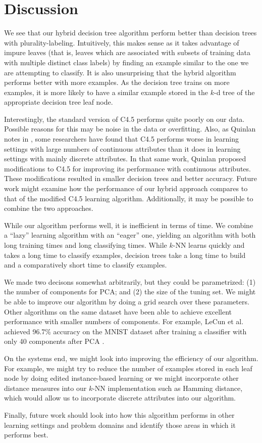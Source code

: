 \section{Discussion}

We see that our hybrid decision tree algorithm perform better than decision trees with plurality-labeling. Intuitively, this makes sense as it takes advantage of impure leaves (that is, leaves which are associated with subsets of training data with multiple distinct class labels) by finding an example similar to the one we are attempting to classify. It is also unsurprising that the hybrid algorithm performs better with more examples. As the decision tree trains on more examples, it is more likely to have a similar example stored in the $k$-d tree of the appropriate decision tree leaf node.

Interestingly, the standard version of C4.5 performs quite poorly on our data. Possible reasons for this may be noise in the data or overfitting. Also, as Quinlan notes in \cite{quinlan1996improved}, some researchers have found that C4.5 performs worse in learning settings with large numbers of continuous attributes than it does in learning settings with mainly discrete attributes. In that same work, Quinlan proposed modifications to C4.5 for improving its performance with continuous attributes. These modifications resulted in smaller decision trees and better accuracy. Future work might examine how the performance of our hybrid approach compares to that of the modified C4.5 learning algorithm.  Additionally, it may be possible to combine the two approaches.

While our algorithm performs well, it is inefficient in terms of time. We combine a ``lazy'' learning algorithm with an ``eager'' one, yielding an algorithm with both long training times and long classifying times. While $k$-NN learns quickly and takes a long time to classify examples, decision trees take a long time to build and a comparatively short time to classify examples.

We made two decisons somewhat arbitrarily, but they could be parametrized: (1) the number of components for PCA; and (2) the size of the tuning set. We might be able to improve our algorithm by doing a grid search over these parameters. Other algorithms on the same dataset have been able to achieve excellent performance with smaller numbers of components.  For example, LeCun et al. achieved 96.7\% accuracy on the MNIST dataset after training a classifier with only 40 components after PCA \cite{lecun1998gradient}.

On the systems end, we might look into improving the efficiency of our algorithm. For example, we might try to reduce the number of examples stored in each leaf node by doing edited instance-based learning or we might incorporate other distance measures into our $k$-NN implementation such as Hamming distance, which would allow us to incorporate discrete attributes into our algorithm.

Finally, future work should look into how this algorithm performs in other learning settings and problem domains and identify those areas in which it performs best.
